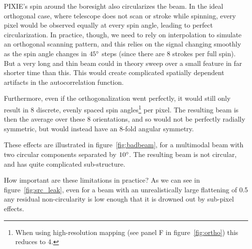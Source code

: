 \documentclass{article}
\begin{document}
PIXIE's spin around the boresight also circularizes the beam. In the ideal
orthogonal case, where telescope does not scan or stroke while spinning, every
pixel would be observed equally at every spin angle, leading to perfect
circularization. In practice, though, we need to rely on interpolation to
simulate an orthogonal scanning pattern, and this relies on the signal changing
smoothly as the spin angle changes in $45\degree$ steps (since there are 8
strokes per full spin). But a very long and thin beam could in theory sweep
over a small feature in far shorter time than this. This would create
complicated spatially dependent artifacts in the autocorrelation function.

Furthermore, even if the orthogonalization went perfectly, it would still only
result in 8 discrete, evenly spaced spin angles\footnote{When using
high-resolution mapping (see panel F in figure~\ref{fig:ortho}) this reduces to
4.} per pixel. The resulting beam is then the average over these 8
orientations, and so would not be perfectly radially symmetric, but would
instead have an 8-fold angular symmetry.

These effects are illustrated in figure~\ref{fig:badbeam}, for a
multimodal beam with two circular components separated by $10\degree$.
The resulting beam is not circular, and has quite complicated sub-structure.

How important are these limitations in practice? As we can see in
figure~\ref{fig:src_leak}, even for a beam with an unrealistically large
flattening of 0.5 any residual non-circularity is low enough
that it is drowned out by sub-pixel effects.
\end{document}
